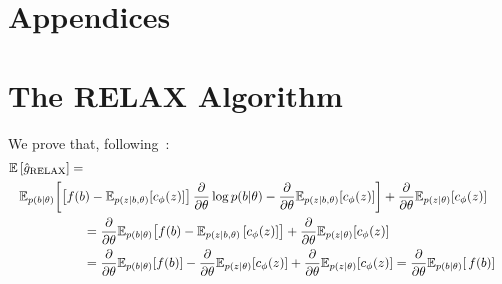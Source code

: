 \documentclass{article}
\newcommand{\discreteDist}{p(b|\theta)}
\newcommand{\loss}{f(b)}
\newcommand{\expectedLoss}{\mathbb{E}_{\discreteDist{}} \! \left[ \, \loss{} \right]}
\newcommand{\E}{\mathbb{E}}
\newcommand{\PT}{\frac{\partial}{\partial \theta}}
\begin{document}





\clearpage
\section*{Appendices}
\appendix




\section{The RELAX Algorithm}
\label{relax proof}

We prove that, following~\cite{tucker2017rebar}:
%
\begin{align}
\E \left[ \hat g_\textnormal{RELAX} \right] = \\
\E_{p(b|\theta)} \! \left[\left[ f(b) - \E_{p(z|b, \theta)} \! \left[c_\phi(z) \right] \right]\PT \log p(b|\theta)  - \PT \E_{p(z|b, \theta)} \! \left[c_\phi(z) \right] \right] + \PT\E_{p(z|\theta)} \! \left[ c_\phi(z) \right] \span & \nonumber\\
&= \PT \E_{p(b|\theta)} \! \left[ f(b) - \E_{p(z|b, \theta)}\left[ c_\phi(z) \right]  \right] + \PT\E_{p(z|\theta)} \! \left[ c_\phi(z) \right]\nonumber\\
&= \PT \E_{p(b|\theta)} \! \left[ f(b) \right] - \PT\E_{p(z|\theta)} \! \left[ c_\phi(z) \right] + \PT\E_{p(z|\theta)} \! \left[ c_\phi(z) \right]
= \PT \expectedLoss{}%
\end{align}
%
\end{document}
